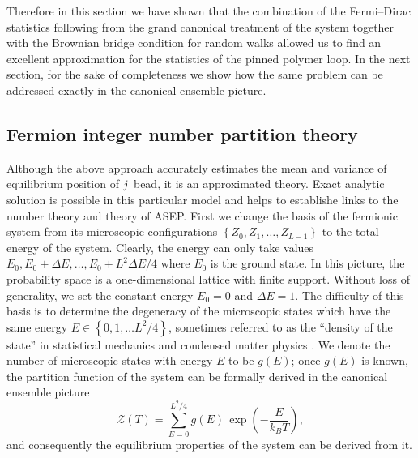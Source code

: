 \documentclass[aps,showpacs,twocolumn,floatfix,prx,superscriptaddress]{revtex4-1}
\begin{document}
Therefore in this section we have shown that the combination of the Fermi--Dirac statistics following from the grand canonical treatment of the system together with the Brownian bridge condition for random walks allowed us to find an excellent approximation for the statistics of the pinned polymer loop. In the next section, for the sake of completeness we show how the same problem can be addressed exactly in the canonical ensemble picture.

\subsection{Fermion integer number partition theory}
Although the above approach accurately estimates the mean and variance of equilibrium position of $j^{\rm}$ bead, it is an approximated theory. Exact analytic solution is possible in this particular model and helps to establishe links to the number theory and theory of ASEP. First we change the basis of the fermionic system from its microscopic configurations $\left\{Z_0,Z_1,\ldots,Z_{L-1}\right\}$ to the total energy of the system. Clearly, the energy can only take values $E_0, E_0+\Delta E, \ldots, E_0 + L^2 \Delta E / 4$ where $E_0$ is the ground state. In this picture, the probability space is a one-dimensional lattice with finite support. Without loss of generality, we set the constant energy $E_0=0$ and $\Delta E=1$. The difficulty of this basis is to determine the degeneracy of the microscopic states which have the same energy $E \in \left\{0,1,\ldots L^2/4\right\}$, sometimes referred to as the ``density of the state'' in statistical mechanics \cite{huang1987statistical} and condensed matter physics \cite{sander2009advanced}. We denote the number of microscopic states with energy $E$ to be $g(E)$; once $g(E)$ is known, the partition function of the system can be formally derived in the canonical ensemble picture
\begin{equation}
\mathcal{Z}\left(T\right) = \sum_{E=0}^{L^2/4} g(E) \, \exp \left(-\frac{E}{k_B T}\right),
\label{eq:par_func}
\end{equation}
and consequently the equilibrium properties of the system can be derived from it. 
\end{document}
